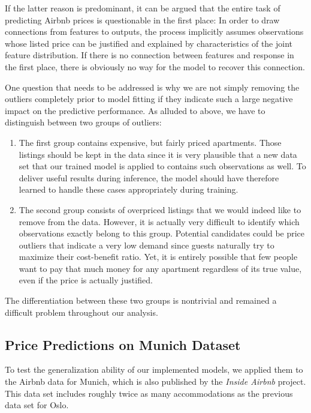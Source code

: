 If the latter reason is predominant, it can be argued that the entire task of predicting Airbnb prices is questionable in the first place:
In order to draw connections from features to outputs, the process implicitly assumes observations whose listed price can be justified and explained by characteristics of the joint feature distribution.
If there is no connection between features and response in the first place, there is obviously no way for the model to recover this connection.

One question that needs to be addressed is why we are not simply removing the outliers completely prior to model fitting if they indicate such a large negative impact on the predictive performance.
As alluded to above, we have to distinguish between two groups of outliers:

\begin{enumerate}
  \item The first group contains expensive, but fairly priced apartments.
        Those listings should be kept in the data since it is very plausible that a new data set that our trained model is applied to contains such observations as well.
        To deliver useful results during inference, the model should have therefore learned to handle these cases appropriately during training.
  \item The second group consists of overpriced listings that we would indeed like to remove from the data.
        However, it is actually very difficult to identify which observations exactly belong to this group.
        Potential candidates could be price outliers that indicate a very low demand since guests naturally try to maximize their cost-benefit ratio.
        Yet, it is entirely possible that few people want to pay that much money for any apartment regardless of its true value, even if the price is actually justified.
\end{enumerate}

The differentiation between these two groups is nontrivial and remained a difficult problem throughout our analysis.


\subsection{Price Predictions on Munich Dataset}

To test the generalization ability of our implemented models, we applied them to the Airbnb data for Munich, which is also published by the \emph{Inside Airbnb} project.
This data set includes roughly twice as many accommodations as the previous data set for Oslo.

